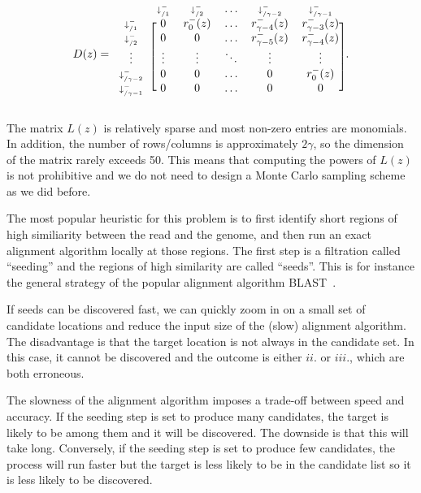 \documentclass{article}
\begin{document}
\begin{equation*}
D(z) = 
\begin{blockarray}{cccccc}
   & \scriptstyle{\downarrow_{/1}^-} & \scriptstyle{\downarrow_{/2}^-} &
    \ldots & \scriptstyle{\downarrow_{/\gamma-2}^-} &
    \scriptstyle{\downarrow_{/\gamma-1}^-} \\
\begin{block}{c[ccccc]}
\scriptstyle{\downarrow_{/1}^-} & 0 & r_0^-(z) & \ldots &
    r_{\gamma-4}^-(z) & r_{\gamma-3}^-(z) \\
\scriptstyle{\downarrow_{/2}^-} & 0 & 0 & \ldots &
    r_{\gamma-5}^-(z) & r_{\gamma-4}^-(z) \\
\vdots & \vdots & \vdots & \ddots & \vdots & \vdots \\
\scriptstyle{\downarrow_{/\gamma-2}^-} & 0 & 0 & \ldots & 0 & r_0^-(z) \\
\scriptstyle{\downarrow_{/\gamma-1}^-} & 0 & 0 & \ldots & 0 & 0 \\
\end{block}
\end{blockarray}.
\end{equation*}


The matrix $L(z)$ is relatively sparse and most non-zero entries are
monomials. In addition, the number of rows/columns is approximately
$2\gamma$, so the dimension of the matrix rarely exceeds 50. This means
that computing the powers of $L(z)$ is not prohibitive and we do not need
to design a Monte Carlo sampling scheme as we did before.

The most popular heuristic for this problem is to first identify short
regions of high similiarity between the read and the genome, and then run
an exact alignment algorithm locally at those regions. The first step is a
filtration called ``seeding'' and the regions of high similarity are
called ``seeds''. This is for instance the general strategy of the popular
alignment algorithm BLAST~\cite{pmid2231712}.

If seeds can be discovered fast, we can quickly zoom in on a small set of
candidate locations and reduce the input size of the (slow) alignment
algorithm. The disadvantage is that the target location is not always in
the candidate set. In this case, it cannot be discovered and the outcome
is either $ii.$ or $iii.$, which are both erroneous.

The slowness of the alignment algorithm imposes a trade-off between speed
and accuracy. If the seeding step is set to produce many candidates, the
target is likely to be among them and it will be discovered. The downside
is that this will take long. Conversely, if the seeding step is set to
produce few candidates, the process will run faster but the target is less
likely to be in the candidate list so it is less likely to be discovered.
\end{document}
